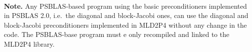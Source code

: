\ \\
\textbf{Note.} Any PSBLAS-based program using the basic preconditioners implemented in PSBLAS 2.0,
i.e.\ the diagonal and block-Jacobi ones, can use the diagonal and block-Jacobi preconditioners
implemented in MLD2P4 without any change in the code. The PSBLAS-base program must e only recompiled
and linked to the MLD2P4 library.

